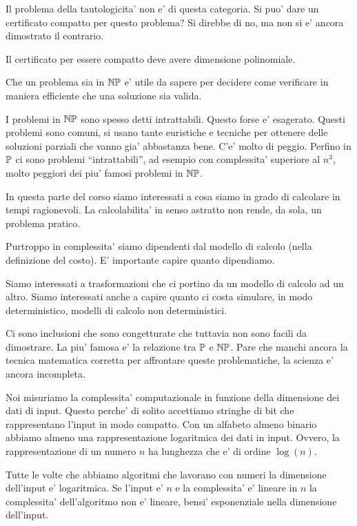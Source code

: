 Il problema della tautologicita' non e' di questa categoria. Si puo' dare un certificato compatto
per questo problema? Si direbbe di no, ma non si e' ancora dimostrato il contrario.

Il certificato per essere compatto deve avere dimensione polinomiale.

Che un problema sia in $\mathbb{NP}$ e' utile da sapere per decidere come verificare in maniera efficiente che
una soluzione sia valida.

I problemi in $\mathbb{NP}$ sono spesso detti intrattabili. Questo forse e' esagerato. Questi problemi
sono comuni, si usano tante euristiche e tecniche per ottenere delle soluzioni parziali che vanno
gia' abbastanza bene. C'e' molto di peggio. Perfino in $\mathbb{P}$ ci sono problemi ``intrattabili'',
ad esempio con complessita' superiore al $n^{3}$, molto peggiori dei piu' famosi problemi in
$\mathbb{NP}$.

In questa parte del corso siamo interessati a cosa siamo in grado di calcolare in tempi ragionevoli.
La calcolabilita' in senso astratto non rende, da sola, un problema pratico.

Purtroppo in complessita' siamo dipendenti dal modello di calcolo (nella definizione del costo). E'
importante capire quanto dipendiamo.

Siamo interessati a trasformazioni che ci portino da un modello di calcolo ad un altro. Siamo
interessati anche a capire quanto ci costa simulare, in modo deterministico, modelli di calcolo non
deterministici.

Ci sono inclusioni che sono congetturate che tuttavia non sono facili da dimostrare. La piu' famosa
e' la relazione tra $\mathbb{P}$ e $\mathbb{NP}$. Pare che manchi ancora la tecnica matematica corretta
per affrontare queste problematiche, la scienza e' ancora incompleta.

Noi misuriamo la complessita' computazionale in funzione della dimensione dei dati di input. Questo
perche' di solito accettiamo stringhe di bit che rappresentano l'input in modo compatto. Con un
alfabeto almeno binario abbiamo almeno una rappresentazione logaritmica dei dati in input. Ovvero,
la rappresentazione di un numero $n$ ha lunghezza che e' di ordine $\log(n)$.

Tutte le volte che abbiamo algoritmi che lavorano con numeri la dimensione dell'input e'
logaritmica. Se l'input e' $n$ e la complessita' e' lineare in $n$ la complessita' dell'algoritmo
non e' lineare, bensi' esponenziale nella dimensione dell'input.

